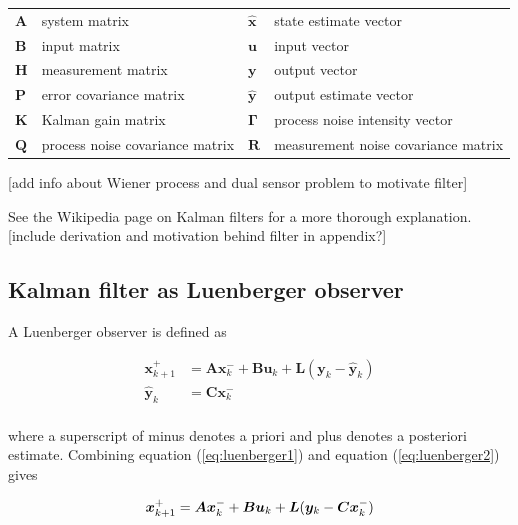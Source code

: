 \documentclass[10pt,conference,compsoc]{IEEEtran}
\newcommand{\mtx}[1] {\bm #1}
\begin{document}
\begin{table}[ht]
  \renewcommand{\arraystretch}{1.3}
  \centering
  \begin{tabular}{llll}
    $\mtx{A}$ & system matrix           &
      $\hat{\mtx{x}}$ & state estimate vector \\
    $\mtx{B}$ & input matrix            & $\mtx{u}$ & input vector \\
    $\mtx{H}$ & measurement matrix      & $\mtx{y}$ & output vector \\
    $\mtx{P}$ & error covariance matrix &
      $\hat{\mtx{y}}$ & output estimate vector \\
    $\mtx{K}$ & Kalman gain matrix &
      $\mtx{\Gamma}$ & process noise intensity vector \\
    $\mtx{Q}$ & process noise covariance matrix &
      $\mtx{R}$ & measurement noise covariance matrix
  \end{tabular}
  \label{tab:kalman_def}
\end{table}

[add info about Wiener process and dual sensor problem to motivate filter]

\noindent See the Wikipedia page on Kalman filters for a more thorough
explanation. [include derivation and motivation behind filter in appendix?]

\subsection{Kalman filter as Luenberger observer}

\noindent A Luenberger observer is defined as

\begin{align}
  \mtx{x}_{k+1}^+ &= \mtx{A} \mtx{x}_k^- + \mtx{B} \mtx{u}_k + \mtx{L}
    (\mtx{y}_k - \hat{\mtx{y}}_k) \label{eq:luenberger1} \\
  \hat{\mtx{y}}_k &= \mtx{C} \mtx{x}_k^- \label{eq:luenberger2} \\ \nonumber
\end{align}

\noindent where a superscript of minus denotes a priori and plus denotes a
posteriori estimate. Combining equation (\ref{eq:luenberger1}) and equation
(\ref{eq:luenberger2}) gives

\begin{equation} \label{eq:luenberger}
  \mtx{x}_{k+1}^+ = \mtx{A} \mtx{x}_k^- + \mtx{B} \mtx{u}_k + \mtx{L}
    (\mtx{y}_k - \mtx{C} \mtx{x}_k^-) \\
\end{equation}
\end{document}
